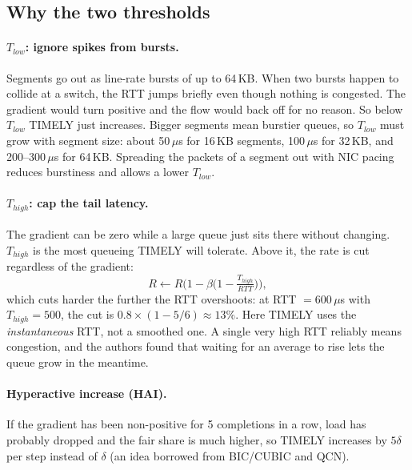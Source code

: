 \subsection{Why the two thresholds}
\paragraph{$T_{low}$: ignore spikes from bursts.} Segments go out as line-rate bursts of up to 64\,KB. When two bursts happen to collide at a switch,
the RTT jumps briefly even though nothing is congested. The gradient would turn positive and the flow would back off for no reason. So below
$T_{low}$ TIMELY just increases. Bigger segments mean burstier queues, so $T_{low}$ must grow with segment size: about 50\,$\mu$s for 16\,KB
segments, 100\,$\mu$s for 32\,KB, and 200--300\,$\mu$s for 64\,KB. Spreading the packets of a segment out with NIC pacing reduces burstiness and
allows a lower $T_{low}$.

\paragraph{$T_{high}$: cap the tail latency.} The gradient can be zero while a large queue just sits there without changing. $T_{high}$ is the most
queueing TIMELY will tolerate. Above it, the rate is cut regardless of the gradient:
\[
  R \leftarrow R\Big(1 - \beta\big(1 - \tfrac{T_{high}}{RTT}\big)\Big),
\]
which cuts harder the further the RTT overshoots: at RTT $= 600\,\mu$s with $T_{high} = 500$, the cut is $0.8 \times (1 - 5/6) \approx 13\%$.
Here TIMELY uses the \emph{instantaneous} RTT, not a smoothed one. A single very high RTT reliably means congestion, and the authors found that
waiting for an average to rise lets the queue grow in the meantime.

\paragraph{Hyperactive increase (HAI).} If the gradient has been non-positive for 5 completions in a row, load has probably dropped and the fair
share is much higher, so TIMELY increases by $5\delta$ per step instead of $\delta$ (an idea borrowed from BIC/CUBIC and QCN).

